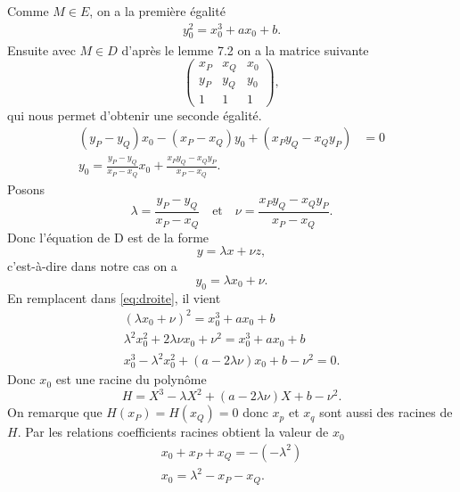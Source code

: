 \begin{demonstration}
\begin{description}
\begin{description}
            Comme $M \in E$, on a la première égalité
            \begin{align}
                \label{eq:droite} 
             y_0^2 = x_0^3 + ax_0 + b 
            .\end{align}
            Ensuite avec $M \in D$ d'après le lemme 7.2 on a la matrice suivante
            \[
                \begin{pmatrix}
                    x_P & x_Q & x_0 \\
                    y_P & y_Q & y_0  \\
                    1   & 1   & 1
                \end{pmatrix}
            ,\] 
           qui nous permet d'obtenir une seconde égalité.
           \begin{align*}
               \left( y_P - y_Q \right)x_0 - \left( x_P - x_Q \right)y_0 + \left( x_P y_Q - x_Q y_P \right) &= 0 \\
               y_0 = \frac{y_P - y_Q}{x_P - x_Q}x_0 + \frac{x_P y_Q - x_Q y_P}{x_P - x_Q}
           .\end{align*}
           Posons 
           \[
           \lambda = \frac{y_P - y_Q}{x_P - x_Q} \quad \text{et} \quad \nu = \frac{x_P y_Q - x_Q y_P}{x_P - x_Q}
           .\] 
           Donc l'équation de D est de la forme
           \[
           y = \lambda x + \nu z
           ,\] 
           c'est-à-dire dans notre cas on a
           \[
           y_0 = \lambda x_0 + \nu
           .\] 
           En remplacent dans \eqref{eq:droite}, il vient
           \begin{align*}
               \left( \lambda x_0 + \nu  \right)^2 = x_0^3 + ax_0 + b \\
               \lambda^2 x_0^2 + 2\lambda \nu x_0 + \nu^2 = x_0^3 + ax_0 + b \\
               x_0^3 - \lambda^2 x_0^2 + \left( a - 2\lambda \nu  \right)x_0 + b - \nu^2 = 0
           .\end{align*}
           Donc $x_0$ est une racine du polynôme
            \[
           H = X^3 - \lambda X^2 + \left( a - 2\lambda\nu \right)X + b - \nu^2
           .\] 
           On remarque que $H(x_P) = H(x_Q) = 0$ donc $x_p$ et $x_q$ sont aussi des racines de $H$.
           Par les relations coefficients racines obtient la valeur de $x_0$
           \begin{align*}
               x_0 + x_P + x_Q = - \left( - \lambda^2 \right) \\
               x_0 = \lambda^2 - x_P - x_Q
           .\end{align*} 

\end{description}
\end{description}
\end{demonstration}
